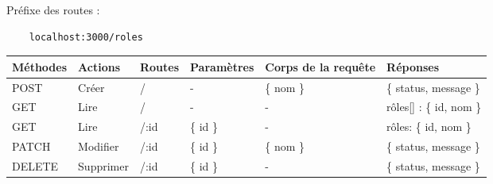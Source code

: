 Préfixe des routes :
\begin{lstlisting}
    localhost:3000/roles
\end{lstlisting}

\begin{center}
    \begin{tabularx}{1\textwidth} {
            | >{\raggedright\arraybackslash}X
            | >{\centering\arraybackslash}X
            | >{\centering\arraybackslash}X
            | >{\centering\arraybackslash}X
            | >{\centering\arraybackslash}X
            | >{\raggedleft\arraybackslash}X |
        }
        \hline
            Méthodes & Actions & Routes & Paramètres & Corps de la requête & Réponses \\
        \hline
            POST  & Créer & / &  - & \{ nom \} & \{ status, message \} \\
        \hline
            GET  & Lire &  / & - & - & r\^oles[] : \{ id, nom \}  \\
        \hline
            GET  & Lire & /:id & \{ id \} & - &  r\^oles: \{ id, nom \} \\
        \hline
            PATCH  & Modifier & /:id & \{ id \} & \{ nom \} & \{ status, message \} \\
        \hline
            DELETE & Supprimer  & /:id & \{ id \} & - & \{ status, message \} \\
        \hline
    \end{tabularx}
\end{center}
